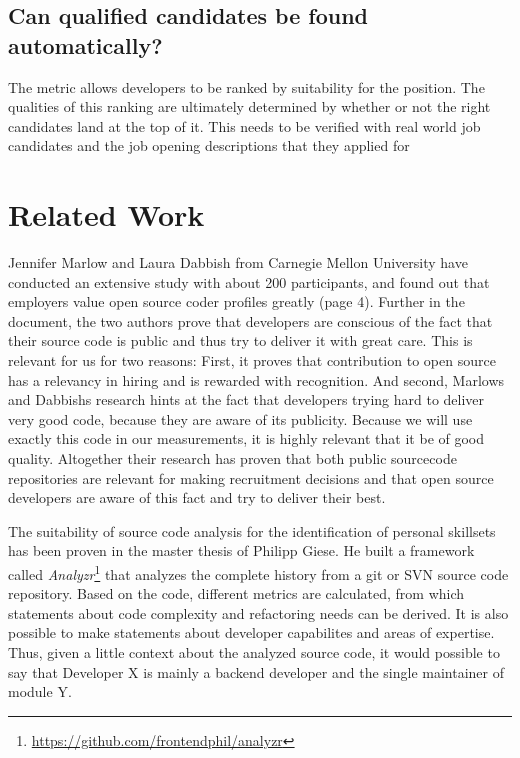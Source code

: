 \subsection{Can qualified candidates be found automatically?}\label{subsec:measurement-quality}
The metric allows developers to be ranked by suitability for the position.
The qualities of this ranking are ultimately determined by whether
or not the right candidates land at the top of it. This needs to be
verified with real world job candidates and the job opening descriptions
that they applied for


\section{Related Work}

Jennifer Marlow and Laura Dabbish\cite{md:2013} from Carnegie Mellon
University have conducted an extensive study with about
200 participants, and found out that employers value
open source coder profiles greatly (page 4). Further in the document,
the two authors prove that developers are conscious of the fact
that their source code is public and thus try to deliver it with
great care. This is relevant for us for two reasons:
First, it proves that contribution to open source has a relevancy
in hiring and is rewarded with recognition. And second, Marlows and Dabbishs
research hints at the fact that developers trying hard to deliver very
good code, because they are aware of its publicity. Because we will use
exactly this code in our measurements, it is highly relevant that it be of good quality.
Altogether their research has proven that both public sourcecode repositories
are relevant for making recruitment decisions and that open source developers
are aware of this fact and try to deliver their best.
\newline

The suitability of source code analysis for the identification of personal
skillsets has been proven in the master thesis of Philipp Giese.
He built a framework called \textit{Analyzr}\footnote{\url{https://github.com/frontendphil/analyzr}}
that analyzes the complete history from a git or SVN source code repository.
Based on the code, different metrics are calculated, from which statements about
code complexity and refactoring needs can be derived. It is also possible
to make statements about developer capabilites and areas of expertise.
Thus, given a little context about the analyzed source code, it would possible
to say that \glqq Developer X is mainly a backend developer and the single maintainer of module Y\grqq.
\newline

